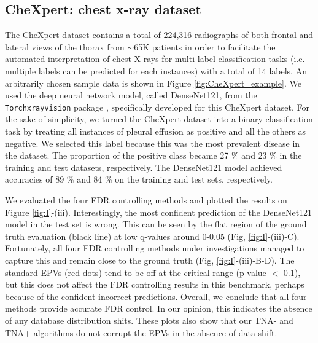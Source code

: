 \documentclass{article}
\begin{document}
\subsection{CheXpert: chest x-ray dataset}

The CheXpert dataset contains a total of 224,316 radiographs of both frontal and lateral views of the thorax from $\sim$65K patients in order to facilitate the automated interpretation of chest X-rays for multi-label classification tasks (i.e. multiple labels can be predicted for each instances) with a total of 14 labels.  An arbitrarily chosen sample data is shown in Figure \ref{fig:CheXpert_example}.  We used the deep neural network model, called DenseNet121, from the \texttt{Torchxrayvision} package \cite{cohen2020limits,Cohen2022xrv}, specifically developed for this CheXpert dataset. For the sake of simplicity, we turned the CheXpert dataset into a binary classification task by treating all instances of pleural effusion as positive and all the others as negative. We selected this label because this was the most prevalent  disease in the dataset. The proportion of the positive class became 27 \% and 23 \% in the training and test datasets, respectively. The DenseNet121 model achieved accuracies of 89 \% and 84 \% on the training and test sets, respectively.

We evaluated the four FDR controlling methods and plotted the results on Figure \ref{fig:I}-(iii). Interestingly, the most confident prediction of the DenseNet121 model in the test set is wrong. This can be seen by the flat region of the ground truth evaluation (black line) at low q-values around 0-0.05 (Fig, \ref{fig:I}-(iii)-C). Fortunately, all four FDR controlling methods under investigations managed to capture this and remain close to the ground truth (Fig, \ref{fig:I}-(iii)-B-D). The standard EPVs (red dots) tend to be off at the critical range (p-value $<$ 0.1), but this does not affect the FDR controlling results in this benchmark, perhaps because of the confident incorrect predictions. Overall, we conclude that all four methods provide accurate FDR control. In our opinion, this indicates the absence of any database distribution shits. These plots also show that our TNA- and TNA+ algorithms do not corrupt  the EPVs in the absence of data shift.
\end{document}

